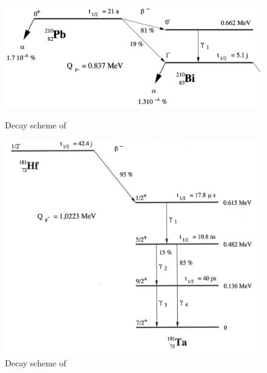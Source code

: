 \begin{figure}[htbp]
    \begin{minipage}[t]{0.5\textwidth}
        \centering
        \includegraphics[width=1\textwidth]{figures/decay_lead210.png}
        \caption{Decay scheme of \lead \cite{notice_VI}}
        \label{fig:lead_decay}
    \end{minipage}
    \begin{minipage}[t]{0.5\textwidth}
        \centering
        \includegraphics[width=\textwidth]{figures/decay_hafnium181.png}
        \caption{Decay scheme of \hafnium \cite{notice_VI}}
        \label{fig:hafnium_decay}
    \end{minipage}
\end{figure}

